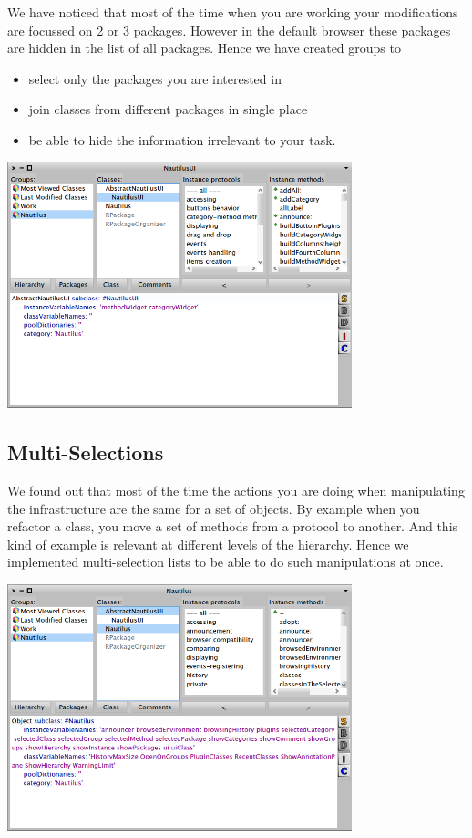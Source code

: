 \documentclass[a4paper,10pt,twoside]{book}
\begin{document}
We have noticed that most of the time when you are working your modifications are focussed on 2 or 3 packages. However in the default browser these packages are hidden in the list of all packages. Hence we have created groups to 
\begin{itemize}
	\item select only the packages you are interested in
	\item join classes from different packages in single place
	\item be able to hide the information irrelevant to your task.
\end{itemize}
\begin{center}
	\includegraphics[width=10cm]{figures/group1}
	\label{fig:group1}
\end{center}

\subsection*{Multi-Selections}

We found out that most of the time the actions you are doing when manipulating the infrastructure are the same for a set of objects. By example when you refactor a class, you move a set of methods from a protocol to another. And this kind of example is relevant at different levels of the hierarchy. Hence we implemented multi-selection lists to be able to do such manipulations at once.
\begin{center}
	\includegraphics[width=10cm]{figures/multiSelection1}
	\label{fig:multiSelection1}
\end{center}
\end{document}
